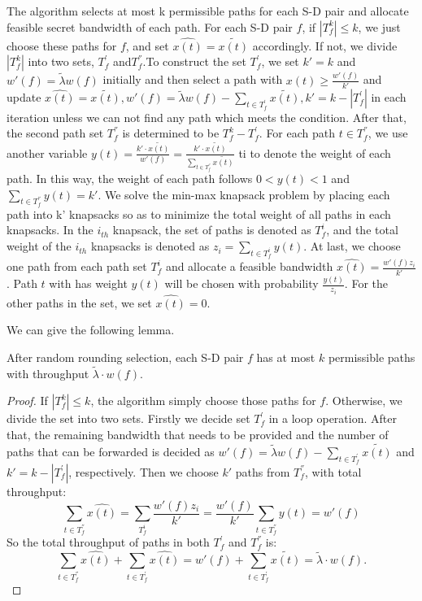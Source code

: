 {The algorithm selects at most k permissible paths  for each S-D pair and allocate feasible secret bandwidth of each path. For each S-D pair $f$, if $|T^k_f| \le k$, we just choose these paths for $f$, and set $\hat{x(t)} = \widetilde{x(t)}$ accordingly. If not, we divide $|T^k_f|$ into two sets, $T^{'}_{f}$ and$ T^{''}_{f}$.To construct the set  $T^{'}_{f}$, we set $k' = k$ and $w'(f) = \widetilde{\lambda}w(f)$ initially and then select a path with $x(t) \ge \frac{w'(f)}{k'}$ and update $\hat{x(t)} = \widetilde{x(t)}, w'(f) = \widetilde{\lambda}w(f) - \sum_{t \in T^{'}_f} \widetilde{x(t)}, k' = k - |T^{'}_f|$ in each iteration unless we can not find any path which meets the condition. After that, the second path set $T^{''}_{f}$ is determined to be $T^k_f - T^{'}_f$. For each path $t \in T^{''}_{f}$, we use another variable $y(t) = \frac{k' \cdot \widetilde{x(t)}}{w'(f)} = \frac{k' \cdot \widetilde{x(t)}}{\sum_{t \in T^{''}_f} \widetilde{x(t)}}$ ti to denote the weight of each path. In this way, the weight of each path  follows $0 < y(t) < 1$ and $\sum_{t \in T^{''}_f}y(t) = k'$. We solve the min-max knapsack problem by placing each path into k' knapsacks so as to minimize the total weight of all paths in each knapsacks. In the $i_{th}$ knapsack, the set of paths is denoted as $T^i_f$, and the total weight of the $i_{th}$ knapsacks is denoted as $z_i = \sum_{t \in T^i_f}y(t)$. At last, we choose one path from each path set $T^i_f$ and allocate a feasible bandwidth $\hat{x(t)} = \frac{w'(f)z_i}{k'}$. Path $t$ with has weight $y(t)$ will be chosen with probability $\frac{y(t)}{z_i}$. For the other paths in the set, we set $\hat{x(t)} = 0$.

We can give the following lemma.
\begin{lemma}
	After random rounding selection, each S-D pair $f$ has at most $k$ permissible paths with throughput $\widetilde{\lambda} \cdot w(f)$.
	
	\begin{proof}
		If $|T^k_f| \le k$, the algorithm simply choose those paths for $f$. Otherwise, we divide the set into two sets. Firstly we decide set $T^{'}_f$ in a loop operation. After that, the remaining bandwidth that needs to be provided and the number of paths that can be forwarded is decided as $w'(f) = \widetilde{\lambda}w(f) - \sum_{t \in T^{'}_f} \widetilde{x(t)}$ and $k' = k - |T^{'}_f|$, respectively. Then we choose $k'$ paths from $T^{''}_f$, with total throughput:
		\begin{equation}
		\sum_{t \in T^{''}_f} \hat{x(t)} = \sum_{T^i_f}\frac{w'(f)z_i}{k'} = \frac{w'(f)}{k'} \sum_{t \in T^{''}_f} y(t) = w'(f)
		\end{equation}
		So the total throughput of paths in both $ T^{'}_f$ and $ T^{''}_f$ is:
		\begin{equation}
		\sum_{t \in T^{''}_f} \hat{x(t)} + \sum_{t \in T^{'}_f} \hat{x(t)} = w'(f) + \sum_{t \in T^{'}_f} \widetilde{x(t)} = \widetilde{\lambda} \cdot w(f).
		\end{equation}
	\end{proof}
\end{lemma}


}
